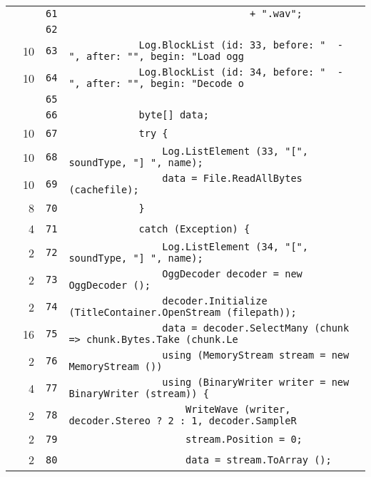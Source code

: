 \documentclass[a4paper,10pt]{article}
\begin{document}
\begin{longtable}[l]{lrrl}
\cellcolor{gray} &  & \verb~61~ & \verb~                               + ".wav";~\\
\cellcolor{gray} &  & \verb~62~ & \verb~~\\
\cellcolor{green} & 10 & \verb~63~ & \verb~            Log.BlockList (id: 33, before: "  - ", after: "", begin: "Load ogg~\\
\cellcolor{green} & 10 & \verb~64~ & \verb~            Log.BlockList (id: 34, before: "  - ", after: "", begin: "Decode o~\\
\cellcolor{gray} &  & \verb~65~ & \verb~~\\
\cellcolor{gray} &  & \verb~66~ & \verb~            byte[] data;~\\
\cellcolor{green} & 10 & \verb~67~ & \verb~            try {~\\
\cellcolor{green} & 10 & \verb~68~ & \verb~                Log.ListElement (33, "[", soundType, "] ", name);~\\
\cellcolor{green} & 10 & \verb~69~ & \verb~                data = File.ReadAllBytes (cachefile);~\\
\cellcolor{green} & 8 & \verb~70~ & \verb~            }~\\
\cellcolor{green} & 4 & \verb~71~ & \verb~            catch (Exception) {~\\
\cellcolor{green} & 2 & \verb~72~ & \verb~                Log.ListElement (34, "[", soundType, "] ", name);~\\
\cellcolor{green} & 2 & \verb~73~ & \verb~                OggDecoder decoder = new OggDecoder ();~\\
\cellcolor{green} & 2 & \verb~74~ & \verb~                decoder.Initialize (TitleContainer.OpenStream (filepath));~\\
\cellcolor{green} & 16 & \verb~75~ & \verb~                data = decoder.SelectMany (chunk => chunk.Bytes.Take (chunk.Le~\\
\cellcolor{green} & 2 & \verb~76~ & \verb~                using (MemoryStream stream = new MemoryStream ())~\\
\cellcolor{green} & 4 & \verb~77~ & \verb~                using (BinaryWriter writer = new BinaryWriter (stream)) {~\\
\cellcolor{green} & 2 & \verb~78~ & \verb~                    WriteWave (writer, decoder.Stereo ? 2 : 1, decoder.SampleR~\\
\cellcolor{green} & 2 & \verb~79~ & \verb~                    stream.Position = 0;~\\
\cellcolor{green} & 2 & \verb~80~ & \verb~                    data = stream.ToArray ();~\\

\end{longtable}
\end{document}
